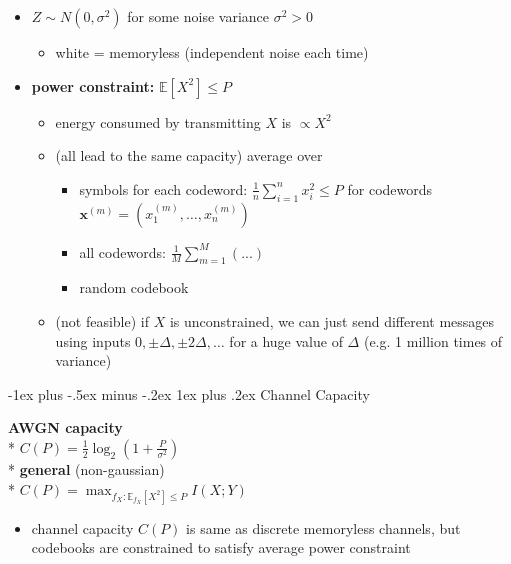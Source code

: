 \documentclass[10pt, landscape]{article}
\makeatletter
\renewcommand{\subsubsection}{\@startsection{subsubsection}{3}{0mm}%
  {-1ex plus -.5ex minus -.2ex}%
  {1ex plus .2ex}%
{\normalfont\small\bfseries}}%
\makeatother
\begin{document}
\begin{multicols*}{4}
  \begin{itemize}
    \item {} $Z \sim N(0, \sigma^2)$ for some noise variance $\sigma^2 > 0$
      \begin{itemize}
        \item white = memoryless (independent noise each time)
      \end{itemize}
    \item \textbf{power constraint:} $\mathbb{E}[X^2] \leq P$
      \begin{itemize}
        \item energy consumed by transmitting $X$ is $\propto X^2$
        \item (all lead to the same capacity) average over
          \begin{itemize}
            \item symbols for each codeword: $\frac{1}{n}\sum^n_{i=1}x^2_i \leq P$ for codewords $\mathbf{x}^{(m)} = ( x_1^{(m)}, \dots, x_n^{(m)} )$
            \item all codewords: $\frac{1}{M}\sum^M_{m=1}(...)$
            \item random codebook
          \end{itemize}
        \item (not feasible) if $X$ is unconstrained, we can just send different messages using inputs $0, \pm \Delta, \pm 2\Delta, \dots$ for a huge value of  $\Delta$ (e.g. 1 million times of variance)
      \end{itemize}
  \end{itemize}

  \subsubsection{Channel Capacity}

  \begin{tightcenter}
    \textbf{AWGN capacity} \\*
    $C(P) = \frac{1}{2} \log_2 (1 + \frac{P}{\sigma^2})$ \\*
    \textbf{general} (non-gaussian) \\*
    \( {\displaystyle{ C(P) = \max_{f_X : \mathbb{E}_{f_X} [X^2] \leq P} I(X;Y) }} \) 
  \end{tightcenter}

  \begin{itemize}
    \item channel capacity $C(P)$ is same as discrete memoryless channels, but codebooks are constrained to satisfy average power constraint
  \end{itemize}


\end{multicols*}
\end{document}
